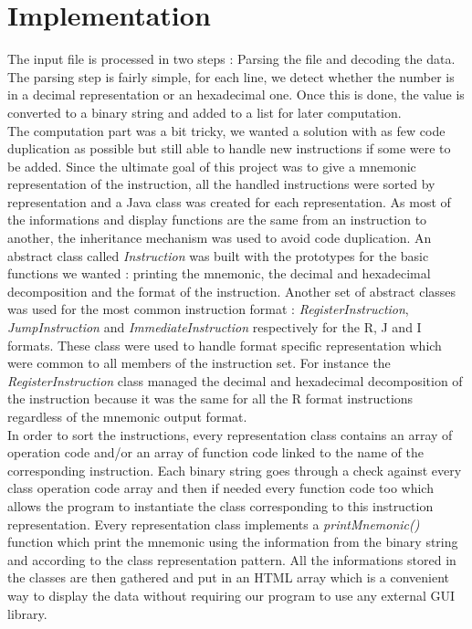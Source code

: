 \section{Implementation}

The input file is processed in two steps : Parsing the file and decoding the data. The parsing step is fairly simple, for each line, we detect whether the number is in a decimal representation or an hexadecimal one. Once this is done, the value is converted to a binary string and added to a list for later computation. \\

The computation part was a bit tricky, we wanted a solution with as few code duplication as possible but still able to handle new instructions if some were to be added. Since the ultimate goal of this project was to give a mnemonic representation of the instruction, all the handled instructions were sorted by representation and a Java class was created for each representation. As most of the informations and display functions are the same from an instruction to another, the inheritance mechanism was used to avoid code duplication. An abstract class called \textit{Instruction} was built with the prototypes for the basic functions we wanted : printing the mnemonic, the decimal and hexadecimal decomposition and the format of the instruction. Another set of abstract classes was used for the most common instruction format : \textit{RegisterInstruction}, \textit{JumpInstruction} and \textit{ImmediateInstruction} respectively for the R, J and I formats. These class were used to handle format specific representation which were common to all members of the instruction set. For instance the \textit{RegisterInstruction} class managed the decimal and hexadecimal decomposition of the instruction because it was the same for all the R format instructions regardless of the mnemonic output format. \\

In order to sort the instructions, every representation class contains an array of operation code and/or an array of function code linked to the name of the corresponding instruction. Each binary string goes through a check against every class operation code array and then if needed every function code too which allows the program to instantiate the class corresponding to this instruction representation. Every representation class implements a \textit{printMnemonic()} function which print the mnemonic using the information from the binary string and according to the class representation pattern.      
All the informations stored in the classes are then gathered and put in an HTML array which is a convenient way to display the data without requiring our program to use any external GUI library. 

